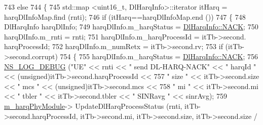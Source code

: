 \begin{DoxyCode}
743                                         \textcolor{keywordflow}{else}
744                                         \{
745                                                 std::map <uint16\_t, DlHarqInfo>::iterator itHarq = 
      harqDlInfoMap.find (rnti);
746                                                 \textcolor{keywordflow}{if} (itHarq==harqDlInfoMap.end ())
747                                                 \{
748                                                         DlHarqInfo harqDlInfo;
749                                                         harqDlInfo.m\_harqStatus = 
      \hyperlink{structns3_1_1DlHarqInfo_a922d2bc13ae01f93cde1a8b4bfccad14ae0560b883a5e22a4d4c40ac562e80374}{DlHarqInfo::NACK};
750                                                         harqDlInfo.m\_rnti = rnti;
751                                                         harqDlInfo.m\_harqProcessId = itTb->second.
      harqProcessId;
752                                                         harqDlInfo.m\_numRetx = itTb->second.rv;
753                                                         \textcolor{keywordflow}{if} (itTb->second.corrupt)
754                                                         \{
755                                                                 harqDlInfo.m\_harqStatus = 
      \hyperlink{structns3_1_1DlHarqInfo_a922d2bc13ae01f93cde1a8b4bfccad14ae0560b883a5e22a4d4c40ac562e80374}{DlHarqInfo::NACK};
756                                                                 \hyperlink{group__logging_ga413f1886406d49f59a6a0a89b77b4d0a}{NS\_LOG\_DEBUG} (\textcolor{stringliteral}{"UE"} << rnti << \textcolor{stringliteral}{"
       send DL-HARQ-NACK"} << \textcolor{stringliteral}{" harqId "} << (\textcolor{keywordtype}{unsigned})itTb->second.harqProcessId <<
757                                                                                                                         \textcolor{stringliteral}{
      " size "} << itTb->second.size << \textcolor{stringliteral}{" mcs "} << (\textcolor{keywordtype}{unsigned})itTb->second.mcs <<
758                                                                                                                         \textcolor{stringliteral}{
      " mi "} << itTb->second.mi << \textcolor{stringliteral}{" tbler "} << itTb->second.tbler << \textcolor{stringliteral}{" SINRavg "} << sinrAvg);
759                                                                 \hyperlink{classns3_1_1MmWaveSpectrumPhy_a88d377424f8b4ca9745807ef3281e010}{m\_harqPhyModule}->
      UpdateDlHarqProcessStatus (rnti, itTb->second.harqProcessId, itTb->second.mi, itTb->second.size, itTb->second.size / 

\end{DoxyCode}
